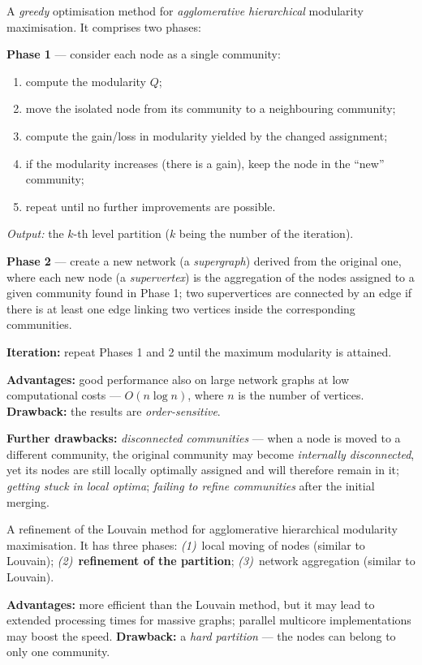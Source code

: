 \documentclass[11pt,a4paper]{article}
\theoremstyle{definition}
\providecommand{\uv}[1]{``#1''}
\begin{document}
\begin{defbox}
A \emph{greedy} optimisation method for \emph{agglomerative hierarchical} modularity maximisation. It
comprises two phases:

\textbf{Phase 1} --- consider each node as a single community:
\begin{enumerate}
\item compute the modularity $Q$;
\item move the isolated node from its community to a neighbouring community;
\item compute the gain/loss in modularity yielded by the changed assignment;
\item if the modularity increases (there is a gain), keep the node in the \uv{new} community;
\item repeat until no further improvements are possible.
\end{enumerate}
\emph{Output:} the $k$-th level partition ($k$ being the number of the iteration).

\textbf{Phase 2} --- create a new network (a \emph{supergraph}) derived from the original one, where
each new node (a \emph{supervertex}) is the aggregation of the nodes assigned to a given community
found in Phase 1; two supervertices are connected by an edge if there is at least one edge linking two
vertices inside the corresponding communities.

\textbf{Iteration:} repeat Phases 1 and 2 until the maximum modularity is attained.

\textbf{Advantages:} good performance also on large network graphs at low computational costs ---
$O(n\log n)$, where $n$ is the number of vertices. \textbf{Drawback:} the results are
\emph{order-sensitive}.

\textbf{Further drawbacks:} \emph{disconnected communities} --- when a node is moved to a different
community, the original community may become \emph{internally disconnected}, yet its nodes are still
locally optimally assigned and will therefore remain in it; \emph{getting stuck in local optima};
\emph{failing to refine communities} after the initial merging.
\end{defbox}

\begin{defbox}
A refinement of the Louvain method for agglomerative hierarchical modularity maximisation. It has
three phases: \emph{(1)}~local moving of nodes (similar to Louvain); \emph{(2)}~\textbf{refinement of
the partition}; \emph{(3)}~network aggregation (similar to Louvain).

\textbf{Advantages:} more efficient than the Louvain method, but it may lead to extended processing
times for massive graphs; parallel multicore implementations may boost the speed. \textbf{Drawback:} a
\emph{hard partition} --- the nodes can belong to only one community.
\end{defbox}
\end{document}
